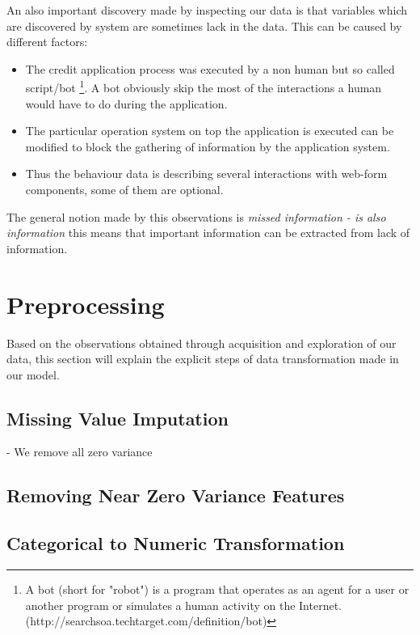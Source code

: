 An also important discovery made by inspecting our data is that variables which are discovered by system are sometimes lack in the data. This can be caused by different factors:
    \begin{itemize}
        \item The credit application process was executed by a non human but so called script/bot \footnote{A bot (short for "robot") is a program that operates as an agent for a user or another program or simulates a human activity on the Internet. (http://searchsoa.techtarget.com/definition/bot)}. A bot obviously skip the most of the interactions a human would have to do during the application. 
    
        \item The particular operation system on top the application is executed can be modified to block the gathering of information by the application system.
        
        \item Thus the behaviour data is describing several interactions with web-form components, some of them are optional.
    \end{itemize}
    The general notion made by this observations is \textit{missed     information - is also information} this means that important information can be extracted from lack of information.

\section{Preprocessing}\label{Ch:2:Preprocessing}
Based on the observations obtained through acquisition and exploration of our data, this section will explain the explicit steps of data transformation made in our model.

\subsection{Missing Value Imputation}\label{Ch:2:MVI} 
  - We remove all zero variance

\subsection{Removing Near Zero Variance Features}\label{Ch:2:RNZVF}

\subsection{Categorical to Numeric Transformation }\label{Ch:2:CTNT}
